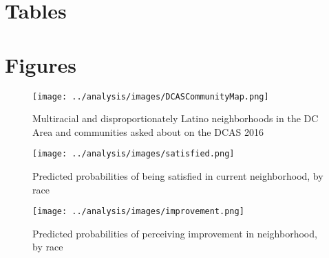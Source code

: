 \documentclass{baderart}
\begin{document}
\clearpage
\singlespace
\singlespace
 	
	


\clearpage 

\section{Tables}



















\clearpage
\section{Figures}

\begin{figure}[h!]
\caption{Multiracial and disproportionately Latino neighborhoods in the DC Area and communities asked about on the DCAS 2016}
\label{fig:map}
\centering
\texttt{[image: ../analysis/images/DCASCommunityMap.png]}
\end{figure}

\begin{sidewaysfigure}
\caption{Predicted probabilities of being satisfied in current neighborhood, by race}
\label{fig:satisfaction}
\centering
\texttt{[image: ../analysis/images/satisfied.png]}
\end{sidewaysfigure}

\begin{sidewaysfigure}
\caption{Predicted probabilities of perceiving improvement in neighborhood, by race}
\label{fig:improvement}
\centering
\texttt{[image: ../analysis/images/improvement.png]}
\end{sidewaysfigure}
\end{document}
